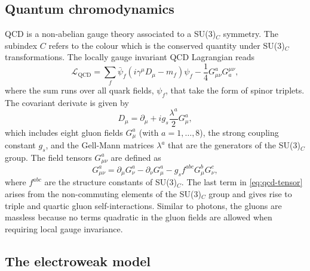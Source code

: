 \subsection{Quantum chromodynamics}
\label{subsec:qcd}
QCD is a non-abelian gauge theory associated to a SU(3)$_C$ symmetry. The subindex $C$ refers to the colour which is the conserved quantity under SU(3)$_C$ transformations.
The locally gauge invariant QCD Lagrangian reads
\begin{equation}
  \mathcal{L}_{\text{QCD}} = \sum_f \bar{\psi}_f(i\gamma^\mu D_\mu - m_f)\psi_f - \frac{1}{4}G_{\mu\nu}^aG^{\mu\nu}_{a},  \label{eq:lqcd}
\end{equation}
where the sum runs over all quark fields, $\psi_f$, that take the form of spinor triplets. 
The covariant derivate is given by
\begin{equation}
    D_\mu = \partial_\mu + i g_s \frac{\lambda^a}{2} G_\mu^a,
\end{equation}
which includes eight gluon fields $G_\mu^a$ (with $a = 1, \ldots, 8$), the strong coupling constant $g_s$, and the Gell-Mann matrices $\lambda^a$ that are the generators of the SU(3)$_C$ group.
The field tensors $G_{\mu\nu}^a$ are defined as
\begin{equation}
  \label{eq:qcd-tensor}
  G_{\mu\nu}^a = \partial_\mu G_\nu^a - \partial_\nu G_\mu^a - g_s f^{abc}G_\mu^b G_\nu^c,
\end{equation}
where $f^{abc}$ are the structure constants of SU(3)$_C$. 
The last term in \cref{eq:qcd-tensor} arises from the non-commuting elements of the SU(3)$_C$ group and gives rise to triple and quartic gluon self-interactions. 
Similar to photons, the gluons are massless because no terms quadratic in the gluon fields are allowed when requiring local gauge invariance. 



\subsection{The electroweak model}
\label{subsec:ew-model}


